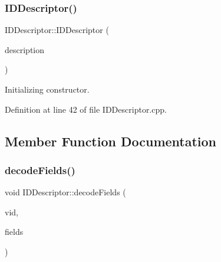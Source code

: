 \hypertarget{class_d_d4hep_1_1_geometry_1_1_i_d_descriptor_a581b17106d07d9a8baec51c6e99cc1dd}{}\label{class_d_d4hep_1_1_geometry_1_1_i_d_descriptor_a581b17106d07d9a8baec51c6e99cc1dd} 
\subsubsection{\texorpdfstring{I\+D\+Descriptor()}{IDDescriptor()}\hspace{0.1cm}{\footnotesize\ttfamily [3/3]}}
{\footnotesize\ttfamily I\+D\+Descriptor\+::\+I\+D\+Descriptor (\begin{DoxyParamCaption}\item[{const std\+::string \&}]{description }\end{DoxyParamCaption})}



Initializing constructor. 



Definition at line 42 of file I\+D\+Descriptor.\+cpp.



\subsection{Member Function Documentation}
\hypertarget{class_d_d4hep_1_1_geometry_1_1_i_d_descriptor_ad946d0b1977723b917f4092cf039235c}{}\label{class_d_d4hep_1_1_geometry_1_1_i_d_descriptor_ad946d0b1977723b917f4092cf039235c} 
\subsubsection{\texorpdfstring{decode\+Fields()}{decodeFields()}}
{\footnotesize\ttfamily void I\+D\+Descriptor\+::decode\+Fields (\begin{DoxyParamCaption}\item[{Volume\+ID}]{vid,  }\item[{\hyperlink{class_d_d4hep_1_1_geometry_1_1_i_d_descriptor_a6c4700a96f3a202eedaa25e54d5695ff}{Vol\+I\+D\+Fields} \&}]{fields }\end{DoxyParamCaption})}



